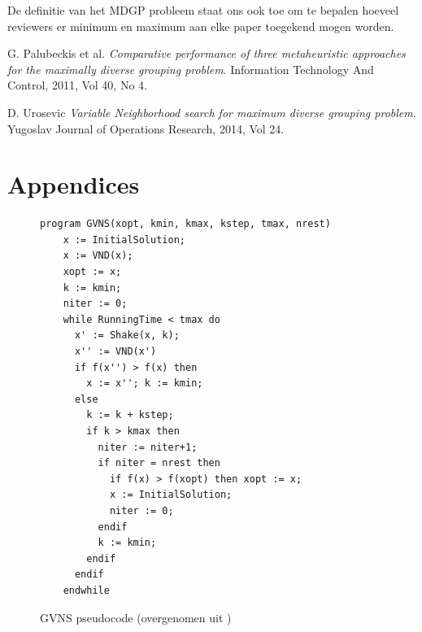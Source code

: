 \documentclass[pdftex,12pt,a4paper]{article}
\begin{document}
De definitie van het MDGP probleem staat ons ook toe om te bepalen hoeveel reviewers er minimum en maximum aan elke paper toegekend mogen worden. 

\newpage
\begin{thebibliography}{9}
  G. Palubeckis et al.
  \emph{Comparative performance of three metaheuristic approaches
for the maximally diverse grouping problem}.
  Information Technology And Control, 2011, Vol 40, No 4.
  
 D. Urosevic
 \emph{Variable Neighborhood search for maximum diverse grouping problem}.
 Yugoslav Journal of Operations Research, 2014, Vol 24.

\end{thebibliography}

\newpage
\section{Appendices}
\begin{figure}[h]
\begin{verbatim}
program GVNS(xopt, kmin, kmax, kstep, tmax, nrest)
    x := InitialSolution;
    x := VND(x);
    xopt := x;
    k := kmin;
    niter := 0;
    while RunningTime < tmax do
      x' := Shake(x, k);
      x'' := VND(x')
      if f(x'') > f(x) then
        x := x''; k := kmin;
      else
        k := k + kstep;
        if k > kmax then
          niter := niter+1;
          if niter = nrest then
            if f(x) > f(xopt) then xopt := x;
            x := InitialSolution;
            niter := 0;
          endif
          k := kmin;
        endif
      endif
    endwhile
\end{verbatim}
\caption{GVNS pseudocode (overgenomen uit \cite{Urosevic})}
\label{apx:gvns_pseudocode}
\end{figure}
\end{document}
